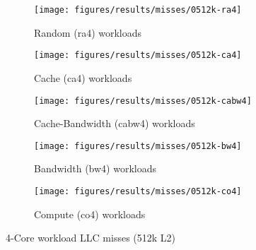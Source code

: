 \begin{figure}
    \centering
    \begin{subfigure}[b]{\textwidth}
            \texttt{[image: figures/results/misses/0512k-ra4]}
            \caption{Random (ra4) workloads}
            \label{fig:results:4core:misses:random}
    \end{subfigure}

    \begin{subfigure}[b]{0.5\textwidth}
            \texttt{[image: figures/results/misses/0512k-ca4]}
            \caption{Cache (ca4) workloads}
            \label{fig:results:4core:misses:cache}
    \end{subfigure}%
    \begin{subfigure}[b]{0.5\textwidth}
            \texttt{[image: figures/results/misses/0512k-cabw4]}
            \caption{Cache-Bandwidth (cabw4) workloads}
            \label{fig:results:4core:misses:cache-bw}
    \end{subfigure}

    \begin{subfigure}[b]{0.5\textwidth}
            \texttt{[image: figures/results/misses/0512k-bw4]}
            \caption{Bandwidth (bw4) workloads}
            \label{fig:results:4core:misses:bw}
    \end{subfigure}%
    \begin{subfigure}[b]{0.5\textwidth}
            \texttt{[image: figures/results/misses/0512k-co4]}
            \caption{Compute (co4) workloads}
            \label{fig:results:4core:misses:co}
    \end{subfigure}%

    \caption{4-Core workload LLC misses (512k L2)}\label{fig:results:4core:misses}
\end{figure}



